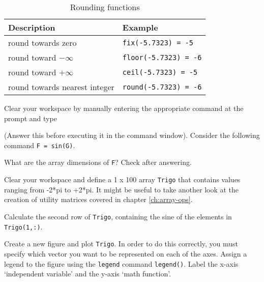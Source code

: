 \begin{table}[ht]
\caption{Rounding functions}
\label{tab:math-functions-rounding}
\vspace{-0.25em}
\centering
\begin{tabularx}{0.8\textwidth}{ |X|X| } \hline
\textbf{Description}&\textbf{Example}\\ \hline
round towards zero&{\tt fix(-5.7323) = -5}\index{fix@\texttt{fix}}\\ \hline
round toward $-\infty$&{\tt floor(-5.7323) = -6}\index{floor@\texttt{floor}}\\ \hline
round toward $+\infty$&{\tt ceil(-5.7323) = -5}\index{ceil@\texttt{ceil}}\\ \hline
round towards nearest integer&{\tt round(-5.7323) = -6}\index{round@\texttt{round}}\\ \hline
\end{tabularx}
\end{table}



\begin{action}
Clear your workspace by manually entering the appropriate command at the prompt and type
\end{action}


\noindent (Answer this before executing it in the command window). Consider the following command {\tt F = sin(G)}. 
\begin{action}
What are the array dimensions of {\tt F}? Check after answering.
\end{action}

\begin{action}
Clear your workspace and define a 1 x 100 array {\tt Trigo} that contains values ranging from -2*pi to +2*pi. It might be useful to take another look at the creation of \MATLAB{} utility matrices covered in chapter \ref{ch:array-ops}.
\end{action}

\begin{action}
Calculate the second row of {\tt Trigo}, containing the sine of the elements in {\tt Trigo(1,:)}.
\end{action}

\begin{action}
Create a new figure and plot {\tt Trigo}. In order to do this correctly, you must specify which vector you want to be represented on each of the axes. Assign a legend to the figure using the {\tt legend} command {\tt legend()}. Label the x-axis `independent variable' and the y-axis `math function'.
\end{action}

